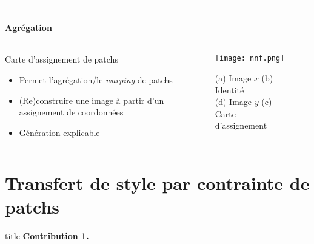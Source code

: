 \documentclass[aspectratio=169, 22pt]{beamer}
\begin{document}
\begin{frame}{\secname~- \subsecname} 
  \framesubtitle{Agrégation}
  \begin{columns}
    \begin{column}{0.6\linewidth}
      \begin{exampleblock}{Carte d'assignement de patchs}
        \begin{itemize}
        \item Permet l'agrégation/le \emph{warping} de patchs
        \item (Re)construire une image à partir d'un \alert{assignement de coordonnées}
        \item Génération explicable
        \end{itemize}
      \end{exampleblock}
    \end{column}
    \begin{column}{0.4\linewidth}
      \begin{figure}
        \centering
        \texttt{[image: nnf.png]}
        \caption{(a) Image $x$ (b) Identité \\ (d) Image $y$ (c) Carte d'assignement}
      \end{figure}
    \end{column}
  \end{columns}
\end{frame}


\section{Transfert de style par contrainte de patchs}
\begin{frame}
  \begin{beamercolorbox}[sep=15pt,center,shadow=true,rounded=true]{title}
    \LARGE\bfseries Contribution 1.\\ \secname
  \end{beamercolorbox}
\end{frame}
\end{document}

